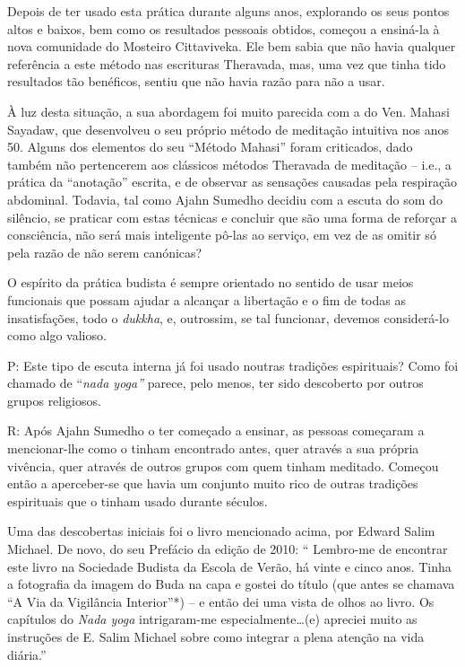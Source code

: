 Depois de ter usado esta prática durante alguns anos, explorando os seus
pontos altos e baixos, bem como os resultados pessoais obtidos, começou
a ensiná-la à nova comunidade do Mosteiro Cittaviveka. Ele bem sabia que
não havia qualquer referência a este método nas escrituras Theravada,
mas, uma vez que tinha tido resultados tão benéficos, sentiu que não
havia razão para não a usar.

À luz desta situação, a sua abordagem foi muito parecida com a do Ven.
Mahasi Sayadaw, que desenvolveu o seu próprio método de meditação
intuitiva nos anos 50. Alguns dos elementos do seu ``Método Mahasi''
foram criticados, dado também não pertencerem aos clássicos métodos
Theravada de meditação -- i.e., a prática da ``anotação'' escrita, e de
observar as sensações causadas pela respiração abdominal. Todavia, tal
como Ajahn Sumedho decidiu com a escuta do som do silêncio, se praticar
com estas técnicas e concluir que são uma forma de reforçar a
consciência, não será mais inteligente pô-las ao serviço, em vez de as
omitir só pela razão de não serem canónicas?

O espírito da prática budista é sempre orientado no sentido de usar
meios funcionais que possam ajudar a alcançar a libertação e o fim de
todas as insatisfações, todo o \emph{dukkha}, e, outrossim, se tal
funcionar, devemos considerá-lo como algo valioso.

P: Este tipo de escuta interna já foi usado noutras tradições
espirituais? Como foi chamado de ``\emph{nada yoga''} parece, pelo
menos, ter sido descoberto por outros grupos religiosos.

R: Após Ajahn Sumedho o ter começado a ensinar, as pessoas começaram a
mencionar-lhe como o tinham encontrado antes, quer através a sua própria
vivência, quer através de outros grupos com quem tinham meditado.
Começou então a aperceber-se que havia um conjunto muito rico de outras
tradições espirituais que o tinham usado durante séculos.

Uma das descobertas iniciais foi o livro mencionado acima, por Edward
Salim Michael. De novo, do seu Prefácio da edição de 2010: `` Lembro-me
de encontrar este livro na Sociedade Budista da Escola de Verão, há
vinte e cinco anos. Tinha a fotografia da imagem do Buda na capa e
gostei do título (que antes se chamava ``A Via da Vigilância
Interior''*) -- e então dei uma vista de olhos ao livro. Os capítulos do
\emph{Nada yoga} intrigaram-me especialmente\ldots{}(e) apreciei muito
as instruções de E. Salim Michael sobre como integrar a plena atenção na
vida diária.''

